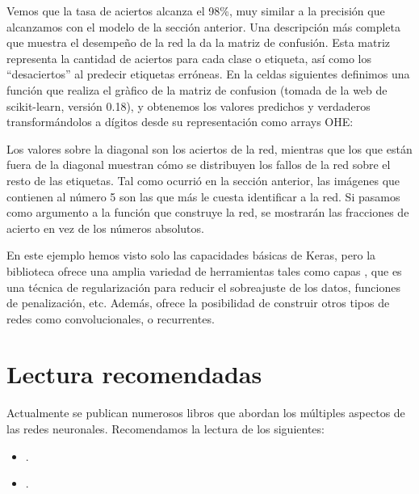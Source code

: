 Vemos que la tasa de aciertos alcanza el 98\%, muy similar a la precisión que alcanzamos con el modelo de la sección anterior. Una descripción más completa que muestra el desempeño de la red la da la matriz de confusión. Esta matriz representa la cantidad de aciertos para cada clase o etiqueta, así como los ``desaciertos'' al predecir etiquetas erróneas. En la celdas siguientes definimos una función que realiza el gràfico de la matriz de confusion (tomada de la web de scikit-learn, versión 0.18), y obtenemos los valores predichos y verdaderos transformándolos a dígitos desde su representación como arrays OHE:


Los valores sobre la diagonal son los aciertos de la red, mientras que los que están fuera de la diagonal muestran cómo se distribuyen los fallos de la red sobre el resto de las etiquetas. Tal como ocurrió en la sección anterior, las imágenes que contienen al número 5 son las que más le cuesta identificar a la red. Si pasamos como argumento  a la función que construye la red, se mostrarán las fracciones de acierto en vez de los números absolutos.

En este ejemplo hemos visto solo las capacidades básicas de Keras, pero la biblioteca ofrece una amplia variedad de herramientas tales como capas , que es una técnica de regularización para reducir el sobreajuste de los datos, funciones de penalización, etc. Además, ofrece la posibilidad de construir otros tipos de redes como convolucionales, o recurrentes.

\section{Lectura recomendadas}
Actualmente se publican numerosos libros que abordan los múltiples aspectos de las redes neuronales. Recomendamos la lectura de los siguientes:
\begin{itemize}
    \item {}.
    \item {}.
\end{itemize}


